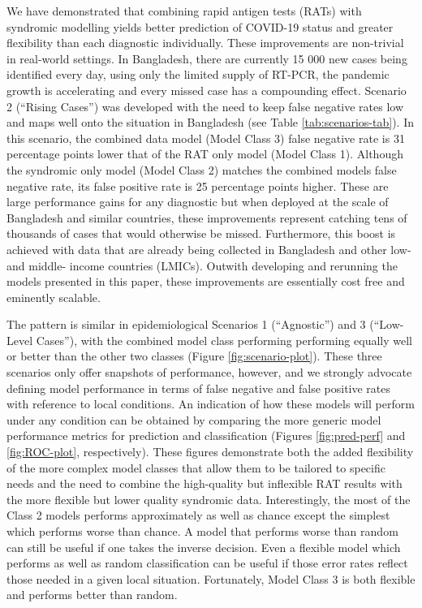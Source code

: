 \documentclass[]{elsarticle} %
\begin{document}
We have demonstrated that combining rapid antigen tests (RATs) with syndromic modelling yields better prediction of COVID-19 status and greater flexibility than each diagnostic individually.
These improvements are non-trivial in real-world settings.
In Bangladesh, there are currently 15 000 new cases being identified every day, using only the limited supply of RT-PCR, the pandemic growth is accelerating and every missed case has a compounding effect.
Scenario 2 (``Rising Cases'') was developed with the need to keep false negative rates low and maps well onto the situation in Bangladesh (see Table \ref{tab:scenarios-tab}).
In this scenario, the combined data model (Model Class 3) false negative rate is
31 percentage points lower that of the RAT only model (Model Class 1).
Although the syndromic only model (Model Class 2) matches the combined models false negative rate, its false positive rate is
25 percentage points higher.
These are large performance gains for any diagnostic but when deployed at the scale of Bangladesh and similar countries, these improvements represent catching tens of thousands of cases that would otherwise be missed.
Furthermore, this boost is achieved with data that are already being collected in Bangladesh and other low- and middle- income countries (LMICs).
Outwith developing and rerunning the models presented in this paper, these improvements are essentially cost free and eminently scalable.

The pattern is similar in epidemiological Scenarios 1 (``Agnostic'') and 3 (``Low-Level Cases''), with the combined model class performing performing equally well or better than the other two classes (Figure \ref{fig:scenario-plot}).
These three scenarios only offer snapshots of performance, however, and we strongly advocate defining model performance in terms of false negative and false positive rates with reference to local conditions.
An indication of how these models will perform under any condition can be obtained by comparing the more generic model performance metrics for prediction and classification (Figures \ref{fig:pred-perf} and \ref{fig:ROC-plot}, respectively).
These figures demonstrate both the added flexibility of the more complex model classes that allow them to be tailored to specific needs and the need to combine the high-quality but inflexible RAT results with the more flexible but lower quality syndromic data.
Interestingly, the most of the Class 2 models performs approximately as well as chance except the simplest which performs worse than chance.
A model that performs worse than random can still be useful if one takes the inverse decision. 
Even a flexible model which performs as well as random classification can be useful if those error rates reflect those needed in a given local situation.
Fortunately, Model Class 3 is both flexible and performs better than random.
\end{document}
